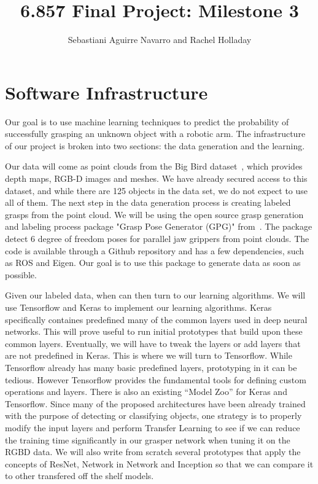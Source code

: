\documentclass[letterpaper, 10 pt]{article}
\begin{document}
\title{6.857 Final Project: Milestone 3}
\author{Sebastiani Aguirre Navarro and Rachel Holladay}
\maketitle

\section{Software Infrastructure}

Our goal is to use machine learning techniques to predict the probability of successfully grasping an unknown object with a robotic arm. 
The infrastructure of our project is broken into two sections: the data generation and the learning. 

Our data will come as point clouds from the Big Bird dataset~\cite{singh2014bigbird}, which provides depth maps, RGB-D images and meshes.
We have already secured access to this dataset, and while there are 125 objects in the data set, we do not expect to use all of them. 
The next step in the data generation process is creating labeled grasps from the point cloud. 
We will be using the open source grasp generation and labeling process package "Grasp Pose Generator (GPG)" from~\cite{pas2017grasp}. 
The package detect 6 degree of freedom poses for parallel jaw grippers from point clouds. 
The code is available through a Github repository and has a few dependencies, such as ROS and Eigen.
Our goal is to use this package to generate data as soon as possible. 

Given our labeled data, when can then turn to our learning algorithms. 
We will use Tensorflow and Keras to implement our learning algorithms. Keras specifically containes predefined many of the common layers used in deep neural networks.
This will prove useful to run initial prototypes that build upon these common layers. Eventually, we will have to tweak the layers or add layers that are not predefined in Keras.
This is where we will turn to Tensorflow. While Tensorflow already has many basic predefined layers, prototyping in it can be tedious. However Tensorflow provides the fundamental tools for defining custom operations and layers.
There is also an existing ``Model Zoo'' for Keras and Tensorflow. Since many of the proposed architectures have been already trained with the purpose of detecting or classifying objects, one strategy is to properly modify the input layers and
perform Transfer Learning to see if we can reduce the training time significantly in our grasper network when tuning it on the RGBD data. We will also write from scratch several prototypes that apply the concepts of ResNet, Network in Network
and Inception so that we can compare it to other transfered off the shelf models. 
\end{document}
